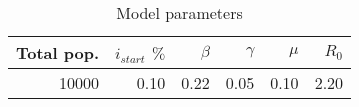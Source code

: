 \begin{table}
\centering
\caption{Model parameters}
\label{tab:params}
\begin{tabular}{rrrrrr}
\toprule
Total pop. & $i_{start}$ $\%$ & $\beta$ & $\gamma$ & $\mu$ & $R_{0}$ \\
\midrule
         10000 &             0.10 &   0.22 &     0.05 &  0.10 &    2.20 \\
\bottomrule
\end{tabular}
\end{table}
